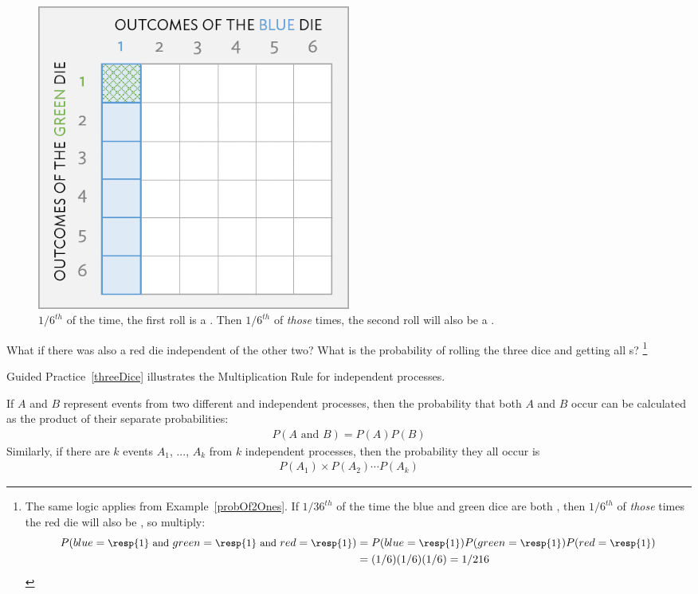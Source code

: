 \begin{figure}[hht]
\centering
\includegraphics[width=0.5\textwidth]{ch_probability_oi_biostat/figures/indepForRollingTwo1s/indepForRollingTwo1s.png}
\caption{$1/6^{th}$ of the time, the first roll is a . Then $1/6^{th}$ of \emph{those} times, the second roll will also be a .}
\label{fig:indepForRollingTwo1s}
\end{figure}

\begin{exercise}{What if there was also a red die independent of the other two? What is the probability of rolling the three dice and getting all s?}\label{threeDice}
\footnote{The same logic applies from Example~\ref{probOf2Ones}. If $1/36^{th}$ of the time the blue and green dice are both , then $1/6^{th}$ of \emph{those} times the red die will also be , so multiply:
{\begin{align*}
P(blue=\text{\small\resp{1} and } green=\text{\small\resp{1} and } red=\text{\small\resp{1}})
	&= P(blue=\text{\small\resp{1}}) P(green=\text{\small\resp{1}}) P(red=\text{\small\resp{1}}) \\
	&= (1/6) (1/6) (1/6)
	= 1/216
\end{align*}} \vspace{-7mm}
}
\end{exercise}

Guided Practice~\ref{threeDice} illustrates the Multiplication Rule for independent processes. 

\begin{termBox}{
If $A$ and $B$ represent events from two different and independent processes, then the probability that both $A$ and $B$ occur can be calculated as the product of their separate probabilities: \vspace{-1.5mm}
\begin{eqnarray}\label{eqForIndependentEvents}
P(A \text{ and }B) = P(A)  P(B)
\end{eqnarray}
Similarly, if there are $k$ events $A_1$, ..., $A_k$ from $k$ independent processes, then the probability they all occur is\vspace{-1.5mm}
\begin{eqnarray*}
P(A_1) \times  P(A_2) \cdots   P(A_k)
\end{eqnarray*}\vspace{-6mm}}
\end{termBox}


